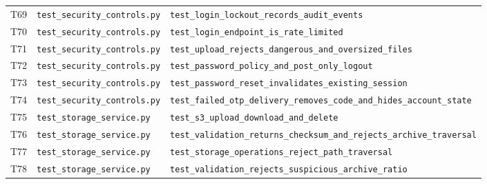 {\begin{longtable}{P{.8cm}P{4cm}P{8cm}}
T69 & \nolinkurl{test_security_controls.py} & \nolinkurl{test_login_lockout_records_audit_events} \\
T70 & \nolinkurl{test_security_controls.py} & \nolinkurl{test_login_endpoint_is_rate_limited} \\
T71 & \nolinkurl{test_security_controls.py} & \nolinkurl{test_upload_rejects_dangerous_and_oversized_files} \\
T72 & \nolinkurl{test_security_controls.py} & \nolinkurl{test_password_policy_and_post_only_logout} \\
T73 & \nolinkurl{test_security_controls.py} & \nolinkurl{test_password_reset_invalidates_existing_session} \\
T74 & \nolinkurl{test_security_controls.py} & \nolinkurl{test_failed_otp_delivery_removes_code_and_hides_account_state} \\
T75 & \nolinkurl{test_storage_service.py} & \nolinkurl{test_s3_upload_download_and_delete} \\
T76 & \nolinkurl{test_storage_service.py} & \nolinkurl{test_validation_returns_checksum_and_rejects_archive_traversal} \\
T77 & \nolinkurl{test_storage_service.py} & \nolinkurl{test_storage_operations_reject_path_traversal} \\
T78 & \nolinkurl{test_storage_service.py} & \nolinkurl{test_validation_rejects_suspicious_archive_ratio} \\
\bottomrule
\end{longtable}}
